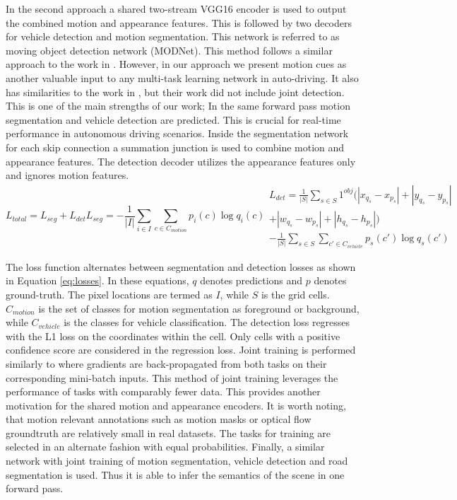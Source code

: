 \documentclass[letterpaper, 10 pt, conference]{ieeeconf}  %
\begin{document}
In the second approach a shared two-stream VGG16 encoder is used to output the combined motion and appearance features. This is followed by two decoders for vehicle detection and motion segmentation. This network is referred to as moving object detection network (MODNet). This method follows a similar approach to the work in \cite{teichmann2016multinet}. However, in our approach we present motion cues as another valuable input to any multi-task learning network in auto-driving. It also has similarities to the work in \cite{jain2017fusionseg}, but their work did not include joint detection. This is one of the main strengths of our work; In the same forward pass motion segmentation and vehicle detection are predicted. This is crucial for real-time performance in autonomous driving scenarios. Inside the segmentation network for each skip connection a summation junction is used to combine motion and appearance features. The detection decoder utilizes the appearance features only and ignores motion features.
\begin{subequations}
\begin{equation}
L_{total}= L_{seg} + L_{det}
\end{equation}
\begin{equation}
L_{seg}= - \frac{1}{|I|} \sum_{i \in I} \sum_{c \in C_{motion}} p_i(c)\log{q_i(c)}
\end{equation}
\begin{align}
L_{det}= \frac{1}{|S|} \sum_{s \in S} 1^{obj} (|x_{q_s}-x_{p_s}| + |y_{q_s}-y_{p_s}| \nonumber \\
+ |w_{q_s}-w_{p_s}| + |h_{q_s}-h_{p_s}|) \nonumber \\
- \frac{1}{|S|} \sum_{s \in S} \sum_{c' \in C_{vehicle}} p_s(c')\log{q_s(c')}
\end{align}
\label{eq:losses}
\end{subequations}

The loss function alternates between segmentation and detection losses as shown in Equation \ref{eq:losses}. In these equations, $q$ denotes predictions and $p$ denotes ground-truth. The pixel locations are termed as $I$, while $S$ is the grid cells. $C_{motion}$ is the set of classes for motion segmentation as foreground or background, while $C_{vehicle}$ is the classes for vehicle classification. The detection loss regresses with the L1 loss on the coordinates within the cell. Only cells with a positive confidence score are considered in the regression loss. Joint training is performed similarly to \cite{teichmann2016multinet} where gradients are back-propagated from both tasks on their corresponding mini-batch inputs. This method of joint training leverages the performance of tasks with comparably fewer data. This provides another motivation for the shared motion and appearance encoders. It is worth noting, that motion relevant annotations such as motion masks or optical flow groundtruth are relatively small in real datasets. The tasks for training are selected in an alternate fashion with equal probabilities. Finally, a similar network with joint training of motion segmentation, vehicle detection and road segmentation is used. Thus it is able to infer the semantics of the scene in one forward pass.
\end{document}
